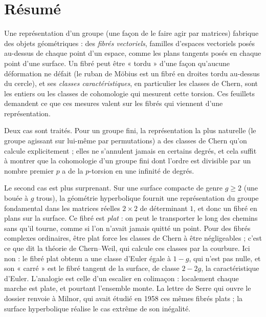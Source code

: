 \documentclass[11pt,a4paper]{article}
\begin{document}
\section*{Résumé}

\begin{resume}
Une représentation d'un groupe (une façon de le faire agir par matrices)
fabrique des objets géométriques : des \emph{fibrés vectoriels}, familles
d'espaces vectoriels posés au-dessus de chaque point d'un espace, comme les
plans tangents posés en chaque point d'une surface. Un fibré peut être
« tordu » d'une façon qu'aucune déformation ne défait (le ruban de Möbius
est un fibré en droites tordu au-dessus du cercle), et ses \emph{classes
caractéristiques}, en particulier les classes de Chern, sont les entiers ou
les classes de cohomologie qui mesurent cette torsion. Ces feuillets
demandent ce que ces mesures valent sur les fibrés qui viennent d'une
représentation.

Deux cas sont traités. Pour un groupe fini, la représentation la plus
naturelle (le groupe agissant sur lui-même par permutations) a des
classes de Chern qu'on calcule explicitement ; elles ne s'annulent jamais en
certains degrés, et cela suffit à montrer que la cohomologie d'un groupe fini
dont l'ordre est divisible par un nombre premier $p$ a de la $p$-torsion en
une infinité de degrés.

Le second cas est plus surprenant. Sur une surface compacte de genre
$g \geq 2$ (une bouée à $g$ trous), la géométrie hyperbolique fournit
une représentation du groupe fondamental dans les matrices réelles $2 \times
2$ de déterminant $1$, et donc un fibré en plans sur la surface. Ce fibré est
\emph{plat} : on peut le transporter le long des chemins sans qu'il tourne,
comme si l'on n'avait jamais quitté un point. Pour des fibrés complexes
ordinaires, être plat force les classes de Chern à être négligeables ;
c'est ce que dit la théorie de Chern--Weil, qui calcule ces classes par la
courbure. Ici non : le fibré plat obtenu a une classe d'Euler égale à
$1 - g$, qui n'est pas nulle, et son « carré » est le fibré tangent de la
surface, de classe $2 - 2g$, la caractéristique d'Euler. L'analogie est celle
d'un escalier en colimaçon : localement chaque marche est plate, et pourtant
l'ensemble monte. La lettre de Serre qui ouvre le dossier renvoie à Milnor,
qui avait étudié en 1958 ces mêmes fibrés plats ; la surface hyperbolique
réalise le cas extrême de son inégalité.


\end{resume}
\end{document}
